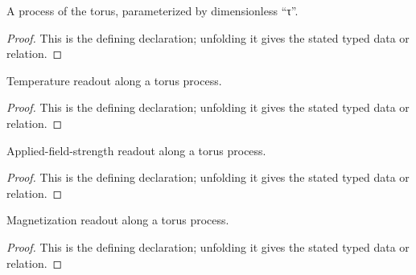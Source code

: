 \begin{definition}[ParamagneticTorusProcess]
  \label{decl:physics:IPhO_2026_3_B_2:ParamagneticTorusProcess}
  A process of the torus, parameterized by dimensionless “τ”.
\end{definition}
\begin{proof}
  This is the defining declaration; unfolding it gives the stated typed data or relation.
\end{proof}

\begin{definition}[temperatureAlongProcessInKelvin]
  \label{decl:physics:IPhO_2026_3_B_2:temperatureAlongProcessInKelvin}
  Temperature readout along a torus process.
\end{definition}
\begin{proof}
  This is the defining declaration; unfolding it gives the stated typed data or relation.
\end{proof}

\begin{definition}[fieldStrengthAlongProcessInSI]
  \label{decl:physics:IPhO_2026_3_B_2:fieldStrengthAlongProcessInSI}
  Applied-field-strength readout along a torus process.
\end{definition}
\begin{proof}
  This is the defining declaration; unfolding it gives the stated typed data or relation.
\end{proof}

\begin{definition}[magnetizationAlongProcessInSI]
  \label{decl:physics:IPhO_2026_3_B_2:magnetizationAlongProcessInSI}
  Magnetization readout along a torus process.
\end{definition}
\begin{proof}
  This is the defining declaration; unfolding it gives the stated typed data or relation.
\end{proof}

